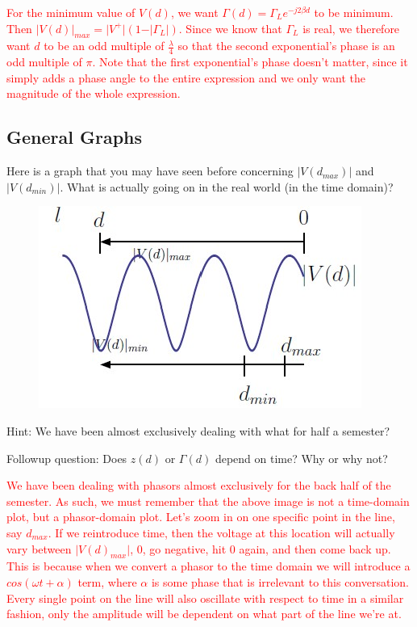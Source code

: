 \documentclass{article}
\begin{document}
\textcolor{red}{For the minimum value of $V(d)$, we want $\Gamma(d) = \Gamma_L e^{-j2\beta d}$ to be minimum. Then $\vert V(d) \vert_{max} = \vert V^+ \vert (1 - \vert \Gamma_L \vert)$. Since we know that $\Gamma_L$ is real, we therefore want $d$ to be an odd multiple of $\frac{\lambda}{4}$ so that the second exponential's phase is an odd multiple of $\pi$. Note that the first exponential's phase doesn't matter, since it simply adds a phase angle to the entire expression and we only want the magnitude of the whole expression.}

\vfill
\newpage

\subsection{General Graphs}

Here is a graph that you may have seen before concerning $\vert V(d_{max}) \vert$ and $\vert V(d_{min}) \vert$. What is actually going on in the real world (in the time domain)?

\begin{figure}[h]
\begin{center}
    \includegraphics[width= 0.5
    \textwidth]{figures/Standing Wave Ratio.jpg}
\end{center}
\end{figure}

Hint: We have been almost exclusively dealing with what for half a semester?

Followup question: Does $z(d)$ or $\Gamma(d)$ depend on time? Why or why not?

\textcolor{red}{We have been dealing with phasors almost exclusively for the back half of the semester. As such, we must remember that the above image is not a time-domain plot, but a phasor-domain plot. Let's zoom in on one specific point in the line, say $d_{max}$. If we reintroduce time, then the voltage at this location will actually vary between $\vert V(d)_{max} \vert$, 0, go negative, hit 0 again, and then come back up. This is because when we convert a phasor to the time domain we will introduce a $cos(\omega t + \alpha)$ term, where $\alpha$ is some phase that is irrelevant to this conversation. Every single point on the line will also oscillate with respect to time in a similar fashion, only the amplitude will be dependent on what part of the line we're at.}
\end{document}
